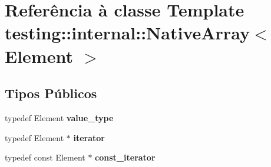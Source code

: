 \hypertarget{classtesting_1_1internal_1_1NativeArray}{\section{Referência à classe Template testing\-:\-:internal\-:\-:Native\-Array$<$ Element $>$}
\label{classtesting_1_1internal_1_1NativeArray}
}
\subsection*{Tipos Públicos}
\begin{DoxyCompactItemize}
\item 
\hypertarget{classtesting_1_1internal_1_1NativeArray_a12216d686e16e4cc63d952fada5b2ba9}{typedef Element {\bfseries value\-\_\-type}}\label{classtesting_1_1internal_1_1NativeArray_a12216d686e16e4cc63d952fada5b2ba9}

\item 
\hypertarget{classtesting_1_1internal_1_1NativeArray_ac1301a57977b57a1ad013e4e25fc2a72}{typedef Element $\ast$ {\bfseries iterator}}\label{classtesting_1_1internal_1_1NativeArray_ac1301a57977b57a1ad013e4e25fc2a72}

\item 
\hypertarget{classtesting_1_1internal_1_1NativeArray_a9ce7c8408460d7158a2870456d134557}{typedef const Element $\ast$ {\bfseries const\-\_\-iterator}}\label{classtesting_1_1internal_1_1NativeArray_a9ce7c8408460d7158a2870456d134557}

\end{DoxyCompactItemize}
